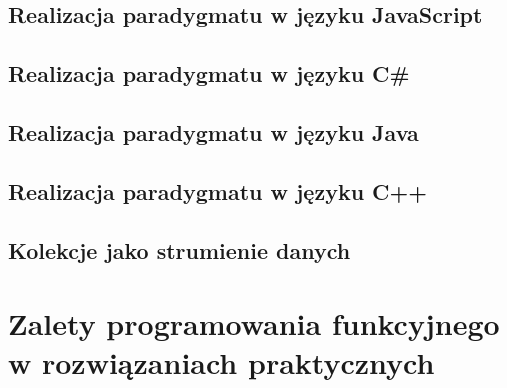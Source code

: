 \documentclass[a4paper,10pt]{report}
\begin{document}
\section{Realizacja paradygmatu w języku JavaScript}
\section{Realizacja paradygmatu w języku C\#}
\section{Realizacja paradygmatu w języku Java}
\section{Realizacja paradygmatu w języku C++}
\section{Kolekcje jako strumienie danych}
\chapter{Zalety programowania funkcyjnego w rozwiązaniach praktycznych}
\end{document}
